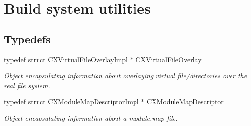 \hypertarget{group__BUILD__SYSTEM}{}\section{Build system utilities}
\label{group__BUILD__SYSTEM}
\subsection*{Typedefs}
\begin{DoxyCompactItemize}
\item 
\mbox{\label{group__BUILD__SYSTEM_gae854e36ceb0a02071e557e19f908772d}} 
typedef struct C\+X\+Virtual\+File\+Overlay\+Impl $\ast$ \mbox{\hyperlink{group__BUILD__SYSTEM_gae854e36ceb0a02071e557e19f908772d}{C\+X\+Virtual\+File\+Overlay}}
\begin{DoxyCompactList}\small\item\em Object encapsulating information about overlaying virtual file/directories over the real file system. \end{DoxyCompactList}\item 
\mbox{\label{group__BUILD__SYSTEM_ga8d7eea7855a8d1118218c7661469b3db}} 
typedef struct C\+X\+Module\+Map\+Descriptor\+Impl $\ast$ \mbox{\hyperlink{group__BUILD__SYSTEM_ga8d7eea7855a8d1118218c7661469b3db}{C\+X\+Module\+Map\+Descriptor}}
\begin{DoxyCompactList}\small\item\em Object encapsulating information about a module.\+map file. \end{DoxyCompactList}\end{DoxyCompactItemize}
